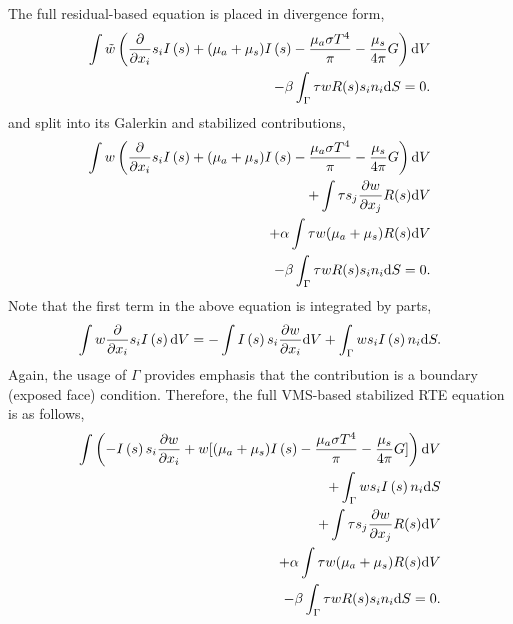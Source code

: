 The full residual-based equation is placed in divergence form,
\begin{eqnarray}
   \int \tilde w \left( {{\partial} \over {\partial x_i}} s_i I\left(s\right)
   + (\mu_a + \mu_s) I\left(s\right) - {{\mu_a \sigma T^4} \over {\pi}} -\frac{\mu_s}{4\pi}G \right) {\rm d}V \nonumber \\
   - \beta \int_\Gamma \tau w R(s) s_i n_i {\rm d}S = 0.
\label{rteDivForm}
\end{eqnarray}
and split into its Galerkin and stabilized contributions,
\begin{eqnarray}
   \int w \left( {{\partial} \over {\partial x_i}} s_i I\left(s\right)
   + (\mu_a + \mu_s )I\left(s\right) - {{\mu_a \sigma T^4} \over {\pi}} -\frac{\mu_s}{4\pi}G \right) {\rm d}V \nonumber \\
 +\int \tau s_j \frac{\partial w }{\partial x_j} R(s) {\rm d}V \nonumber \\
+\alpha\int \tau w (\mu_a + \mu_s)R(s) {\rm d}V \nonumber \\
- \beta \int_\Gamma \tau w R(s) s_i n_i {\rm d}S = 0.
\label{rteDivFormSub}
\end{eqnarray}
Note that the first term in the above equation is integrated by parts,
\begin{equation}
\int w {{\partial} \over {\partial x_i}} s_i I\left(s\right) {\rm d}V = -\int I\left(s\right) s_i \frac{\partial w}{\partial x_i} {\rm d}V 
+ \int_{\Gamma} w s_i I\left(s\right) n_i {\rm d}S.
\end{equation}
Again, the usage of $\Gamma$ provides emphasis that the contribution is a boundary (exposed face) condition. 
Therefore, the full VMS-based stabilized RTE equation is as follows,
\begin{eqnarray}
   \int \left( -I\left(s\right) s_i \frac{\partial w}{\partial x_i} + w [(\mu_a + \mu_s) I\left(s\right) 
- {{\mu_a \sigma T^4} \over {\pi}} -\frac{\mu_s}{4\pi}G ] \right) {\rm d}V  \nonumber \\
+ \int_\Gamma w s_i I\left(s\right) n_i {\rm d}S \nonumber \\
 +\int \tau s_j \frac{\partial w }{\partial x_j} R(s) {\rm d}V \nonumber \\
+\alpha\int \tau w (\mu_a + \mu_s)R(s) {\rm d}V \nonumber \\
- \beta \int_\Gamma \tau w R(s) s_i n_i {\rm d}S = 0.
\label{rteDivFormSub}
\end{eqnarray}

